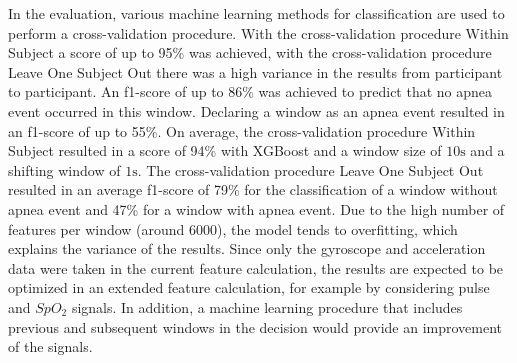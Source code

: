 In the evaluation, various machine learning methods for classification are used to perform a cross-validation procedure. 
With the cross-validation procedure {\glqq Within Subject\grqq} a score of up to 95\% was achieved, with the cross-validation procedure {\glqq Leave One Subject Out\grqq} there was a high variance in the results from participant to participant. 
An f1-score of up to 86\% was achieved to predict that no apnea event occurred in this window. 
Declaring a window as an apnea event resulted in an f1-score of up to 55\%.
On average, the cross-validation procedure {\glqq Within Subject\grqq} resulted in a score of 94\% with XGBoost and a window size of $10\si{\s}$ and a shifting window of $1\si{\s}$. 
The cross-validation procedure {\glqq Leave One Subject Out\grqq} resulted in an average f1-score of 79\% for the classification of a window without apnea event and 47\% for a window with apnea event. 
Due to the high number of features per window (around 6000), the model tends to overfitting, which explains the variance of the results.
Since only the gyroscope and acceleration data were taken in the current feature calculation, the results are expected to be optimized in an extended feature calculation, for example by considering pulse and $SpO_2$ signals. 
In addition, a machine learning procedure that includes previous and subsequent windows in the decision would provide an improvement of the signals.

\cleardoublepage